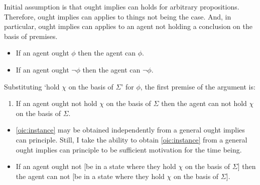 \documentclass[10pt]{article}
\newcommand{\hozlinedash}[0]{%
  \noindent\hdashrule[0.5ex][c]{\textwidth}{.1pt}{2.5pt}
}
\begin{document}
\hozlinedash

\newpage

Initial assumption is that ought implies can holds for arbitrary propositions.
Therefore, ought implies can applies to things not being the case.
And, in particular, ought implies can applies to an agent not holding a conclusion on the basis of premises.

\begin{itemize}
\item If an agent ought \(\phi\) then the agent can \(\phi\).
\item If an agent ought \(\lnot\phi\) then the agent can \(\lnot\phi\).
\end{itemize}

Substituting `hold \(\chi\) on the basis of \(\Sigma\)' for \(\phi\), the first premise of the argument is:

\begin{enumerate}[label=P\arabic*., ref=P\arabic*]
\item\label{oic:instance} If an agent ought not hold \(\chi\) on the basis of \(\Sigma\) then the agent can not hold \(\chi\) on the basis of \(\Sigma\).
\end{enumerate}

\begin{itemize}
\item \ref{oic:instance} may be obtained independently from a general ought implies can principle.
  Still, I take the ability to obtain \ref{oic:instance} from a general ought implies can principle to be sufficient motivation for the time being.
\item If an agent ought not [be in a state where they hold \(\chi\) on the basis of \(\Sigma\)] then the agent can not [be in a state where they hold \(\chi\) on the basis of \(\Sigma\)].
\end{itemize}
\end{document}
